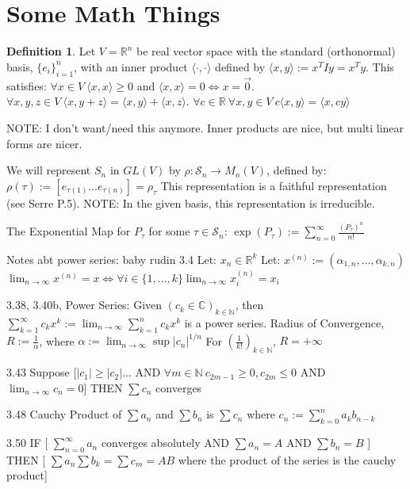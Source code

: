 \documentclass{article}
\theoremstyle{definition}
\newtheorem{definition}{Definition}
\begin{document}
\section{Some Math Things}
\begin{definition}
Let $V=\mathbb{R}^n$ be real vector space with the standard (orthonormal) basis, $\{e_i\}_{i=1}^n$, with an inner product $\langle \cdot,\cdot \rangle$ defined by $\langle x,y\rangle := x^T Iy = x^Ty$. This satisfies:
$\forall x \in V \: \langle x,x \rangle \geq 0 $ and $\langle x,x\rangle=0 \iff x=\vec{0} $.
$\forall x,y,z \in V \: \langle x,y+z \rangle= \langle x,y \rangle +  \langle x,z \rangle$.
$\forall c \in \mathbb{R} \: \forall x,y \in V \: c\langle x,y \rangle=\langle x,cy \rangle$
\end{definition}
NOTE: I don't want/need this anymore. Inner products are nice, but multi linear forms are nicer.

We will represent $S_n$ in $GL(V)$ by $\rho : \mathcal{S}_n \rightarrow M_n(V)$, defined by: \( \rho(\tau) := [ e_{\tau(1)} \dots e_{\tau(n)} ]= \rho_{\tau} \)
This representation is a faithful representation (see Serre P.5).
NOTE: In the given basis, this representation is irreducible. 

The Exponential Map for $  P_\tau $ for some $\tau \in \mathcal{S}_n $:
$ \exp(P_\tau ) := \sum_{n=0}^\infty \frac{ (P_\tau)^n}{n!} $

Notes abt power series:
baby rudin
3.4 
Let: $ x_n \in \mathbb{R}^k $
Let: $x^{(n)} := (\alpha_{1,n}, \dots, \alpha_{k,n})$
$ \lim_{n\rightarrow \infty}x^{(n)} = x \iff \forall i \in \{1,\dots,k\} \lim_{n\rightarrow \infty} x_i^{(n)} = x_i $

3.38, 3.40b,
Power Series: Given $(c_k \in \mathbb{C})_{k\in\mathbb{N}}$, then $ \sum_{k=1}^\infty c_k x^k := \lim_{n \rightarrow \infty} \sum_{k=1}^n c_k x^k $ is a power series.
Radius of Convergence, $R:= \frac{1}{\alpha}$, where $\alpha := \lim_{n \rightarrow \infty} \sup |c_n|^{1/n} $
For $(\frac{1}{k!})_{k\in\mathbb{N}} $, $R=+\infty$

3.43
Suppose [$ |c_1|\geq |c_2| \dots $ AND $\forall m \in \mathbb{N} \: c_{2m-1} \geq 0, c_{2m} \leq 0 $ AND $\lim_{n\rightarrow \infty} c_n = 0$] THEN $\sum c_n$ converges

3.48
Cauchy Product of $\sum a_n$ and $\sum b_n$ is $ \sum c_n $ where $ c_n :=\sum_{k=0}^n a_k b_{n-k}$

3.50
IF [ $\sum_{n=0}^\infty a_n $ converges absolutely AND $\sum a_n = A$ AND $\sum b_n = B$ ] THEN [ $\sum a_n \sum b_k = \sum c_m = AB$ where the product of the series is the cauchy product]
\end{document}
